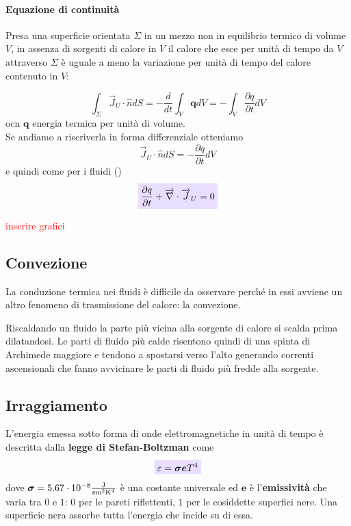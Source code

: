 \documentclass[x11names]{report}
\newcommand{\viola}[1]{\colorbox{yred}{$\displaystyle #1$}}
\begin{document}
	\paragraph{Equazione di continuità} Presa una superficie orientata \(\Sigma\) in un mezzo non in equilibrio termico di volume \(V\), in assenza di sorgenti di calore in \(V\) il calore che esce per unità di tempo da \(V\) attraverso \(\Sigma\) è uguale a meno la variazione per unità di tempo del calore contenuto in \(V\):
	
	\[ 
	\int_{\Sigma} \overrightarrow{J}_U \cdot \hat{n} dS = -\frac{d}{dt}\int_V \boldsymbol{q} dV = - \int_V \frac{\partial q}{\partial t} dV
	\]
	ocn \(\boldsymbol{q}\) energia termica per unità di volume. \\
	
	\noindent
	Se andiamo a riscriverla in forma differenziale otteniamo
	\[ 
	\overrightarrow{J}_U \cdot \hat{n}dS = - \frac{\partial q}{\partial t} dV
	\]
	e quindi come per i fluidi ()
	\begin{equation}
		\viola{	\frac{\partial q}{\partial t} + \overrightarrow{\nabla} \cdot \overrightarrow{J}_U  = 0 }
	\end{equation}
	
	\begin{center}
		\textcolor{red}{inserire grafici}
	\end{center}
	
	
	\subsection{Convezione}
	La conduzione termica nei fluidi è difficile da osservare perché in essi avviene un altro fenomeno di trasmissione del calore: la convezione.
	
	Riscaldando un fluido la parte più vicina alla sorgente di calore si scalda prima dilatandosi. Le parti di fluido più calde risentono quindi di una spinta di Archimede maggiore e tendono a spostarsi verso l'alto generando correnti ascensionali che fanno avvicinare le parti di fluido più fredde alla sorgente. 
	
	\subsection{Irraggiamento}
	L'energia emessa sotto forma di onde elettromagnetiche in unità di tempo è descritta dalla \textbf{legge di Stefan-Boltzman} come
	\begin{equation}\label{stefan boltzman}
		\viola{\varepsilon = \boldsymbol{\sigma e}T^4}
	\end{equation}
	dove \(\boldsymbol{\sigma} = 5.67\cdot 10^{-8}\SI{}{\frac{\joule}{\second\meter^2\kelvin^4}}\) è una costante universale ed \(\boldsymbol{e}\) è l'\textbf{emissività} che varia tra \(0\) e \(1\): \(0\) per le pareti riflettenti, \(1\) per le cosiddette superfici nere. Una superficie nera assorbe tutta l'energia che incide su di essa.
	
\end{document}
